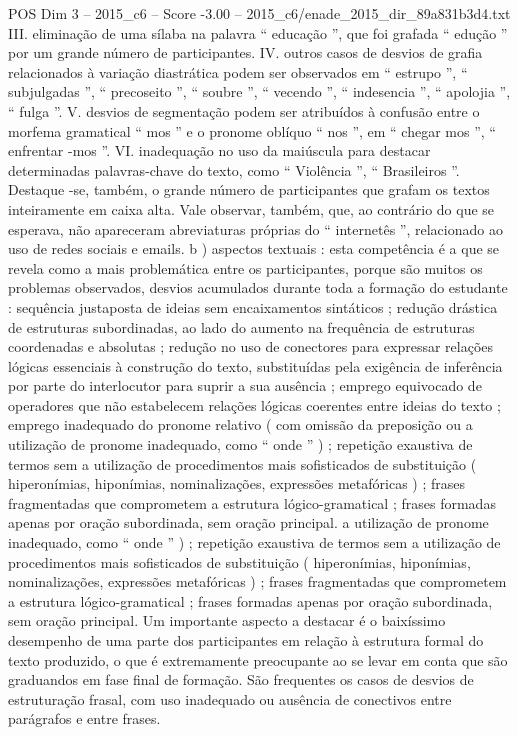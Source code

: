 \begin{textsample}{POS Dim 3 – 2015\_c6 – Score -3.00 – 2015\_c6/enade\_2015\_dir\_89a831b3d4.txt}
III. eliminação de uma sílaba na palavra “ educação ”, que foi grafada “ edução ” por um grande número de participantes.
IV. outros casos de desvios de grafia relacionados à variação diastrática podem ser observados em “ estrupo ”, “ subjulgadas ”, “ precoseito ”, “ soubre ”, “ vecendo ”, “ indesencia ”, “ apolojia ”, “ fulga ”.
V. desvios de segmentação podem ser atribuídos à confusão entre o morfema gramatical “ mos ” e o pronome oblíquo “ nos ”, em “ chegar mos ”, “ enfrentar -mos ”.
VI. inadequação no uso da maiúscula para destacar determinadas palavras-chave do texto, como “ Violência ”, “ Brasileiros ”.
Destaque -se, também, o grande número de participantes que grafam os textos inteiramente em caixa alta.
Vale observar, também, que, ao contrário do que se esperava, não apareceram abreviaturas próprias do “ internetês ”, relacionado ao uso de redes sociais e emails. b ) aspectos textuais : esta competência é a que se revela como a mais problemática entre os participantes, porque são muitos os problemas observados, desvios acumulados durante toda a formação do estudante : sequência justaposta de ideias sem encaixamentos sintáticos ; redução drástica de estruturas subordinadas, ao lado do aumento na frequência de estruturas coordenadas e absolutas ; redução no uso de conectores para expressar relações lógicas essenciais à construção do texto, substituídas pela exigência de inferência por parte do interlocutor para suprir a sua ausência ; emprego equivocado de operadores que não estabelecem relações lógicas coerentes entre ideias do texto ; emprego inadequado do pronome relativo ( com omissão da preposição ou a utilização de pronome inadequado, como “ onde ” ) ; repetição exaustiva de termos sem a utilização de procedimentos mais sofisticados de substituição ( hiperonímias, hiponímias, nominalizações, expressões metafóricas ) ; frases fragmentadas que comprometem a estrutura lógico-gramatical ; frases formadas apenas por oração subordinada, sem oração principal. a utilização de pronome inadequado, como “ onde ” ) ; repetição exaustiva de termos sem a utilização de procedimentos mais sofisticados de substituição ( hiperonímias, hiponímias, nominalizações, expressões metafóricas ) ; frases fragmentadas que comprometem a estrutura lógico-gramatical ; frases formadas apenas por oração subordinada, sem oração principal.
Um importante aspecto a destacar é o baixíssimo desempenho de uma parte dos participantes em relação à estrutura formal do texto produzido, o que é extremamente preocupante ao se levar em conta que são graduandos em fase final de formação.
São frequentes os casos de desvios de estruturação frasal, com uso inadequado ou ausência de conectivos entre parágrafos e entre frases.

\end{textsample}
